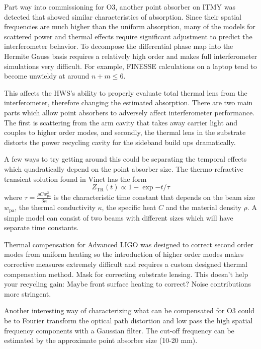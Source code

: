 	Part way into commissioning for O3, another point absorber on ITMY was detected that showed similar characteristics of absorption.  Since their spatial frequencies are much higher than the uniform absorption, many of the models for scattered power and thermal effects require significant adjustment to predict the interferometer behavior.  To decompose the differential phase map into the Hermite Gauss basis requires a relatively high order and makes full interferometer simulations very difficult.  For example, FINESSE calculations on a laptop tend to become unwieldy at around $n+m \leq 6$.   
	
	This affects the HWS's ability to properly evaluate total thermal lens from the interferometer, therefore changing the estimated absorption.  There are two main parts which allow point absorbers to adversely affect interferometer performance.   The first is scattering from the arm cavity that takes away carrier light and couples to higher order modes, and secondly, the thermal lens in the substrate distorts the power recycling cavity for the sideband build ups dramatically.
	
	A few ways to try getting around this could be separating the temporal effects which quadratically depend on the point absorber size. The thermo-refractive transient solution found in Vinet \cite{Vinet_Thermal_Issues} has the form
	\begin{equation}
	Z_{\text{TR}}(t)   \propto 1-\exp{-t/ \tau}
	\end{equation}
	where $\tau = \frac{\rho C w_\text{pa}^2}{3 \kappa} $ is the characteristic time constant that depends on the beam size $w_\text{pa}$, the thermal conductivity $\kappa$, the specific heat $C$ and the material density $\rho$.  A simple model can consist of two beams with different sizes which will have separate time constants.  
	
	Thermal compensation for Advanced LIGO was designed to correct second order modes from uniform heating so the introduction of higher order modes makes corrective measures extremely difficult and requires a custom designed thermal compensation method.  Mask for correcting substrate lensing. This doesn't help your recycling gain: Maybe front surface heating to correct?  Noise contributions more stringent. 
	
	Another interesting way of characterizing what can be compensated for O3 could be to Fourier transform the optical path distortion and low pass the high spatial frequency components with a Gaussian filter. The cut-off frequency can be estimated by the approximate point absorber size (10-20 mm).
	
